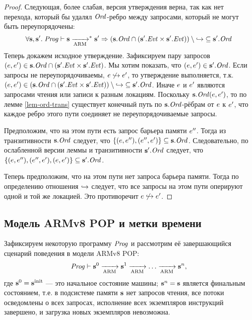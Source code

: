 \begin{proof}
  Следующая, более слабая, версия утверждения верна, так как нет перехода, который
  бы удалял $\mathit{Ord}$-ребро между запросами, который не могут быть переупорядочены:
  \[
    \forall \mathbf{s}, \mathbf{s}'. \; \mathit{Prog} \vdash \mathbf{s} \xrightarrow[\text{ARM}]{}^{*} \mathbf{s}'  \Rightarrow (\mathbf{s}.\mathit{Ord} \cap (\mathbf{s}'.\mathit{Evt} \times \mathbf{s}'.\mathit{Evt})) \setminus { \hookrightarrow }\subseteq \mathbf{s}'.\mathit{Ord}
  \]
  Теперь докажем исходное утверждение.
  Зафиксируем пару запросов $(e, e') \in \mathbf{s}.\mathit{Ord} \cap (\mathbf{s}'.\mathit{Evt} \times \mathbf{s}'.\mathit{Evt})$.
  Мы хотим показать, что $(e, e') \in \mathbf{s}'.\mathit{Ord}$.
  Если запросы не переупорядочиваемы, $e \not \hookrightarrow e'$, то утверждение выполняется,
  т.к.
  $(e, e') \in (\mathbf{s}.\mathit{Ord} \cap (\mathbf{s}'.\mathit{Evt} \times \mathbf{s}'.\mathit{Evt})) \setminus { \hookrightarrow } \subseteq \mathbf{s}'.\mathit{Ord}$.
  Иначе $e$ и $e'$ являются запросами чтения или записи к разным локациям.
  Поскольку $\mathbf{s}.\mathit{Ord}(e, e')$, то по лемме \ref{lem-ord-trans}
  существует конечный путь по $\mathbf{s}.\mathit{Ord}$-рёбрам от $e$ к $e'$, что
  каждое ребро этого пути соединяет не переупорядочиваемые запросы.
  
  Предположим, что на этом пути есть запрос барьера памяти $e''$.
  Тогда из транзитивности $\mathbf{s}.\mathit{Ord}$ следует, что $\{(e, e''), (e'', e')\} \subseteq \mathbf{s}.\mathit{Ord}$.
  Следовательно, по ослабленной версии леммы и транзитивности $\mathbf{s}'.\mathit{Ord}$ следует, что
  $\{(e, e''), (e'', e'), (e, e')\} \subseteq \mathbf{s}'.\mathit{Ord}$.
  
  Теперь предположим, что на этом пути нет запроса барьера памяти.
  Тогда по определению отношения $\hookrightarrow$ следует,
  что все запросы на этом пути оперируют одной и той же локацией.
  Это противоречит $e \not \hookrightarrow e'$.
\end{proof}

\subsection{Модель ARMv8 POP и метки времени}
\label{sec:arm-timestamps}
Зафиксируем некоторую программу $\mathit{Prog}$ и рассмотрим её завершающийся сценарий
поведения в модели ARMv8 POP:
$$
\mathit{Prog} \vdash \mathbf{s}^0 \xrightarrow[\text{ARM}]{} \mathbf{s}^1 \xrightarrow[\text{ARM}]{} \dots \xrightarrow[\text{ARM}]{} \mathbf{s}^n,
$$
где $\mathbf{s}^0 = \mathbf{s}^{\rm init}$ --- это начальное состояние машины; $\mathbf{s}^n = \mathbf{s}$ является финальным состоянием,
т.е. в подсистеме памяти $\mathbf{s}$ нет запросов чтения, все потоки осведомлены о всех
запросах, исполнение всех экземпляров инструкций завершено, и загрузка новых
экземпляров невозможна.

